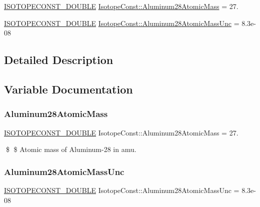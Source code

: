 \begin{DoxyCompactItemize}
\item 
\mbox{\hyperlink{group___isotope_const-_macros_ga8f45a7272ce02c0b4c65c44636ed719a}{I\+S\+O\+T\+O\+P\+E\+C\+O\+N\+S\+T\+\_\+\+D\+O\+U\+B\+LE}} \mbox{\hyperlink{group___isotope_const-_aluminum-_al28_ga6430d8cde171d96bd2ce74fd77b963af}{Isotope\+Const\+::\+Aluminum28\+Atomic\+Mass}} = 27.
\item 
\mbox{\hyperlink{group___isotope_const-_macros_ga8f45a7272ce02c0b4c65c44636ed719a}{I\+S\+O\+T\+O\+P\+E\+C\+O\+N\+S\+T\+\_\+\+D\+O\+U\+B\+LE}} \mbox{\hyperlink{group___isotope_const-_aluminum-_al28_ga6708e1a50b9741cc29c9b9d7738434e3}{Isotope\+Const\+::\+Aluminum28\+Atomic\+Mass\+Unc}} = 8.\+3e-\/08
\end{DoxyCompactItemize}


\subsection{Detailed Description}


\subsection{Variable Documentation}
\mbox{\label{group___isotope_const-_aluminum-_al28_ga6430d8cde171d96bd2ce74fd77b963af}} 
\subsubsection{\texorpdfstring{Aluminum28\+Atomic\+Mass}{Aluminum28AtomicMass}}
{\footnotesize\ttfamily \mbox{\hyperlink{group___isotope_const-_macros_ga8f45a7272ce02c0b4c65c44636ed719a}{I\+S\+O\+T\+O\+P\+E\+C\+O\+N\+S\+T\+\_\+\+D\+O\+U\+B\+LE}} Isotope\+Const\+::\+Aluminum28\+Atomic\+Mass = 27.}

\$ \$ Atomic mass of Aluminum-\/28 in amu. \mbox{\label{group___isotope_const-_aluminum-_al28_ga6708e1a50b9741cc29c9b9d7738434e3}} 
\subsubsection{\texorpdfstring{Aluminum28\+Atomic\+Mass\+Unc}{Aluminum28AtomicMassUnc}}
{\footnotesize\ttfamily \mbox{\hyperlink{group___isotope_const-_macros_ga8f45a7272ce02c0b4c65c44636ed719a}{I\+S\+O\+T\+O\+P\+E\+C\+O\+N\+S\+T\+\_\+\+D\+O\+U\+B\+LE}} Isotope\+Const\+::\+Aluminum28\+Atomic\+Mass\+Unc = 8.\+3e-\/08}

